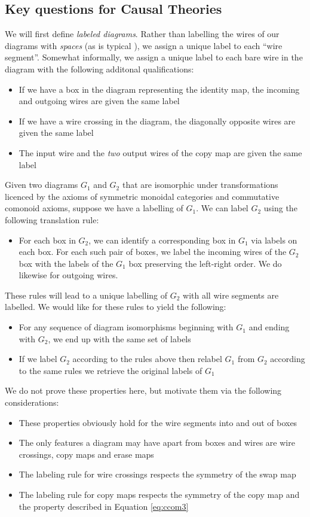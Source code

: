\subsection{Key questions for Causal Theories}

We will first define \emph{labeled diagrams}. Rather than labelling the wires of our diagrams with \emph{spaces} (as is typical \citep{selinger_survey_2010}), we assign a unique label to each ``wire segment''. Somewhat informally, we assign a unique label to each bare wire in the diagram with the following additonal qualifications:
\begin{itemize}
	\item If we have a box in the diagram representing the identity map, the incoming and outgoing wires are given the same label
	\item If we have a wire crossing in the diagram, the diagonally opposite wires are given the same label
	\item The input wire and the \emph{two} output wires of the copy map are given the same label
\end{itemize}
Given two diagrams $G_1$ and $G_2$ that are isomorphic under transformations licenced by the axioms of symmetric monoidal categories and commutative comonoid axioms, suppose we have a labelling of $G_1$. We can label $G_2$ using the following translation rule:
\begin{itemize}
	\item For each box in $G_2$, we can identify a corresponding box in $G_1$ via labels on each box. For each such pair of boxes, we label the incoming wires of the $G_2$ box with the labels of the $G_1$ box preserving the left-right order. We do likewise for outgoing wires.
\end{itemize}

These rules will lead to a unique labelling of $G_2$ with all wire segments are labelled. We would like for these rules to yield the following:
\begin{itemize}
	\item For any sequence of diagram isomorphisms beginning with $G_1$ and ending with $G_2$, we end up with the same set of labels
	\item If we label $G_2$ according to the rules above then relabel $G_1$ from $G_2$ according to the same rules we retrieve the original labels of $G_1$
\end{itemize}

We do not prove these properties here, but motivate them via the following considerations:
\begin{itemize}
 	\item These properties obviously hold for the wire segments into and out of boxes
 	\item The only features a diagram may have apart from boxes and wires are wire crossings, copy maps and erase maps
 	\item The labeling rule for wire crossings respects the symmetry of the swap map
 	\item The labeling rule for copy maps respects the symmetry of the copy map and the property described in Equation \ref{eq:ccom3}
\end{itemize}

